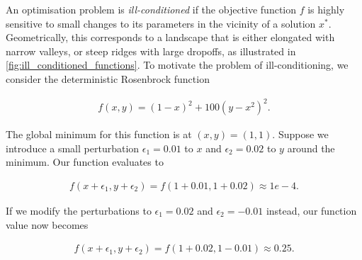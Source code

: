 \label{sssec:ill_conditioning}



An optimisation problem is \textit{ill-conditioned} if the objective function $f$ is highly sensitive to small changes to its parameters in the vicinity of a solution $x^*$. Geometrically, this corresponds to a landscape that is either elongated with narrow valleys, or steep ridges with large dropoffs, as illustrated in \cref{fig:ill_conditioned_functions}. To motivate the problem of ill-conditioning, we consider the deterministic Rosenbrock function

\begin{align}

    f(x,y) = (1 - x)^2 + 100(y - x^2)^2.

    \label{eq:rosenbrock_function}

\end{align}

The global minimum for this function is at $(x,y) = (1,1)$. Suppose we introduce a small perturbation $\epsilon_1 = 0.01$ to $x$ and $\epsilon_2 = 0.02$ to $y$ around the minimum. Our function evaluates to

\begin{align}

    f(x + \epsilon_1, y + \epsilon_2) = f(1 + 0.01, 1 + 0.02)

    \approx 1e-4.

\end{align}

If we modify the perturbations to $\epsilon_1 = 0.02$ and $\epsilon_2 = -0.01$ instead, our function value now becomes

\begin{align}

    f(x + \epsilon_1, y + \epsilon_2) = f(1 + 0.02, 1 - 0.01)

    \approx 0.25.

\end{align}



